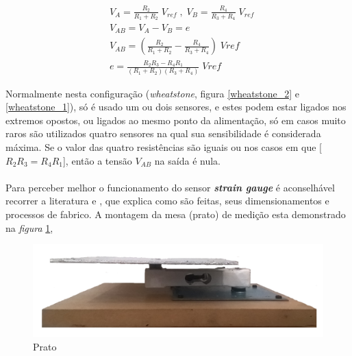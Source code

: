 \begin{minipage}[!b]{.6\linewidth}
	\setlength{\jot}{10pt}%
	\begin{align}
		\label{eq:wheatstone}
		&V_A =  \frac{R_2}{R_1 + R_2} \; V_{ref} \; , \; V_B=\frac{R_4}{R_3 + R_4} \; V_{ref} \\
		&V_{AB} =  V_A - V_B = e \\
		&V_{AB}= \left(\frac{R_2}{R_1 + R_2} - \frac{R_4}{R_3 + R_4}\right) \; Vref \\
		&e = \frac{R_2 R_3 - R_4 R_1}{(R_1 + R_2)(R_3 + R_4)} \; Vref
	\end{align}
\end{minipage}
Normalmente nesta configuração (\textit{wheatstone}, figura \ref{wheatstone_2} e \ref{wheatstone_1}), só é usado um ou dois sensores, e estes podem estar ligados nos extremos opostos, ou ligados ao mesmo ponto da alimentação, só em casos muito raros são utilizados quatro sensores na qual sua sensibilidade é considerada máxima. Se o valor das quatro resistências são iguais ou nos casos em que [$R_2 R_3 = R_4 R_1$], então a tensão $V_{AB}$ na saída é nula.
\\
\\
Para perceber melhor o funcionamento do sensor \textit{\textbf{strain gauge}} é aconselhável recorrer a literatura \cite{book-9} e \cite{book-10}, que explica como são feitas, seus dimensionamentos e processos de fabrico.
\newpage
A montagem da mesa (prato) de medição  esta demonstrado na \textit{figura} \ref{Prato},
\begin{minipage}[!b]{\linewidth}
\begin{figure}[H]
	\centering
	\includegraphics[scale=0.16]{./image/PESTA/material/Prato.jpg}
	\caption{Prato}
	\label{Prato}
\end{figure}
\end{minipage}
\newpage
